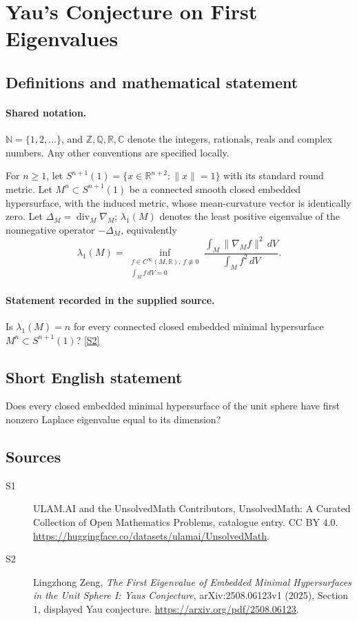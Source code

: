 \documentclass[11pt]{article}
\newcommand{\sref}[2]{\hyperlink{source:#1:#2}{[S#2]}}
\begin{document}
\section{Yau's Conjecture on First Eigenvalues}\label{statement}

\subsection{Definitions and mathematical statement}

\paragraph{Shared notation.}$\mathbb N=\{1,2,\ldots\}$, and $\mathbb Z,\mathbb Q,\mathbb R,\mathbb C$ denote the integers, rationals, reals and complex numbers. Any other conventions are specified locally.


For $n\geq1$, let $S^{n+1}(1)=\{x\in\mathbb R^{n+2}:\lVert x\rVert=1\}$ with its standard round metric. Let $M^n\subset S^{n+1}(1)$ be a connected smooth closed embedded hypersurface, with the induced metric, whose mean-curvature vector is identically zero. Let $\Delta_M=\operatorname{div}_M\nabla_M$; $\lambda_1(M)$ denotes the least positive eigenvalue of the nonnegative operator $-\Delta_M$, equivalently
\[
\lambda_1(M)=\inf_{\substack{f\in C^\infty(M,\mathbb R),\ f\not\equiv0\\\int_M f\,dV=0}}
\frac{\int_M\lVert\nabla_Mf\rVert^2\,dV}{\int_M f^2\,dV}.
\]
\paragraph{Statement recorded in the supplied source.}
Is $\lambda_1(M)=n$ for every connected closed embedded minimal hypersurface $M^n\subset S^{n+1}(1)$? \sref{statement}{2}

\subsection{Short English statement}
Does every closed embedded minimal hypersurface of the unit sphere have first nonzero Laplace eigenvalue equal to its dimension?
\subsection{Sources}
\begin{description}
\item[\hypertarget{source:statement:1}{S1}] ULAM.AI and the UnsolvedMath Contributors, UnsolvedMath: A Curated Collection of Open Mathematics Problems, catalogue entry. CC BY 4.0. \url{https://huggingface.co/datasets/ulamai/UnsolvedMath}.
\item[\hypertarget{source:statement:2}{S2}] Lingzhong Zeng, \emph{The First Eigenvalue of Embedded Minimal Hypersurfaces in the Unit Sphere I: Yau\textquotesingle s Conjecture}, arXiv:2508.06123v1 (2025), Section 1, displayed Yau conjecture. \url{https://arxiv.org/pdf/2508.06123}.
\end{description}
\label{end:statement}
\end{document}
